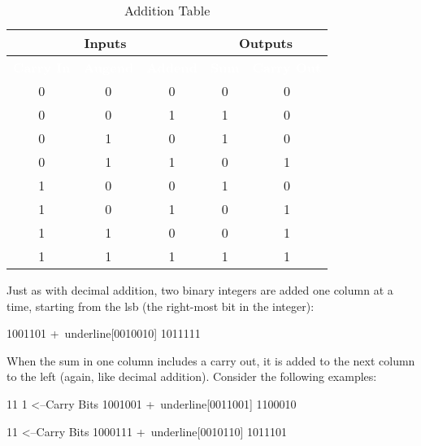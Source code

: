 \begin{table}[H]
  \sffamily
  \newcommand{\head}[1]{\textcolor{white}{\textbf{#1}}}    
  \begin{center}
    \begin{tabular}{ c c c | c c } \hline
      \multicolumn{3}{c|}{\textbf{Inputs}} & \multicolumn{2}{c}{\textbf{Outputs}} \\
      \hline
      \rowcolor{black!75}
      \head{Carry In} & \head{Augend} & \head{Addend} & \head{Sum} & \head{Carry Out} \\
      \hline
      0        & 0      & 0      & 0   & 0 \\
      0        & 0      & 1      & 1   & 0 \\
      0        & 1      & 0      & 1   & 0 \\
      0        & 1      & 1      & 0   & 1 \\
      1        & 0      & 0      & 1   & 0 \\
      1        & 0      & 1      & 0   & 1 \\
      1        & 1      & 0      & 0   & 1 \\
      1        & 1      & 1      & 1   & 1 \\ \hline
    \end{tabular}
  \end{center}
  \caption{Addition Table}
  \label{MO:tab:binary_addition_table}
\end{table} 

Just as with decimal addition, two binary integers are added one column at a time, starting from the \gls{lsb} (the right-most bit in the integer): 

\begin{binDisp}[commandchars=~\[\]]
      1001101
     +~underline[0010010]
      1011111
\end{binDisp}

When the sum in one column includes a carry out, it is added to the next column to the left (again, like decimal addition). Consider the following examples:

\begin{binDisp}[commandchars=~\[\]]
       11  1  <--Carry Bits
      1001001
     +~underline[0011001]
      1100010
\end{binDisp}

\begin{binDisp}[commandchars=~\[\], samepage=true]
         11   <--Carry Bits
      1000111
     +~underline[0010110]
      1011101
\end{binDisp}

